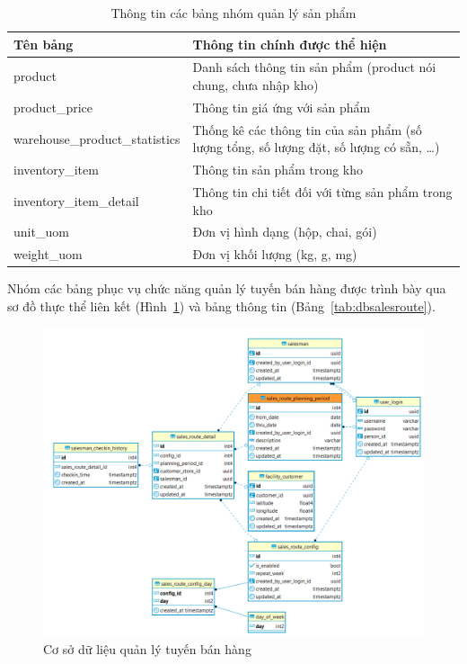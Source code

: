\begin{table}[H]
\centering
\begin{tabular}{| m{6cm} | m{10cm} |}
\hline
\textbf{Tên bảng} & \textbf{Thông tin chính được thể hiện} \\
\hline

product &
Danh sách thông tin sản phẩm (product nói chung, chưa nhập kho) \\
\hline
product\_price &
Thông tin giá ứng với sản phẩm \\
\hline
warehouse\_product\_statistics &
Thống kê các thông tin của sản phẩm
(số lượng tổng, số lượng đặt, số lượng có sẵn, …) \\
\hline
inventory\_item &
Thông tin sản phẩm trong kho  \\
\hline
inventory\_item\_detail &
Thông tin chi tiết đối với từng sản phẩm trong kho \\
\hline
unit\_uom &
Đơn vị hình dạng (hộp, chai, gói) \\
\hline
weight\_uom &
Đơn vị khối lượng (kg, g, mg) \\

\hline
\end{tabular}
\caption{Thông tin các bảng nhóm quản lý sản phẩm}
\label{tab:dbproduct}
\end{table}

Nhóm các bảng phục vụ chức năng quản lý tuyến bán hàng
được trình bày qua sơ đồ thực thể liên kết (Hình~\ref{fig:dbsalesroute})
và bảng thông tin (Bảng~\ref{tab:dbsalesroute}).
\begin{figure}[H]
\centering
\includegraphics[width=17cm]{images/database/sales-route.png}
\caption{Cơ sở dữ liệu quản lý tuyến bán hàng}
\label{fig:dbsalesroute}
\end{figure}

